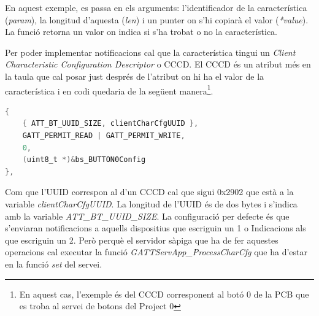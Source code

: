 En aquest exemple, es passa en els arguments: l'identificador de la característica (\textit{param}), la longitud d'aquesta (\textit{len}) i un punter on s'hi copiarà el valor (\textit{*value}).
La funció retorna un valor on indica si s'ha trobat o no la característica.

Per poder implementar notificacions cal que la característica tingui un \textit{Client Characteristic Configuration Descriptor} o CCCD.
El CCCD és un atribut més en la taula que cal posar just després de l'atribut on hi ha el valor de la característica i en codi quedaria de la següent manera\footnote{En aquest cas, l'exemple és del CCCD corresponent al botó 0 de la PCB que es troba al servei de botons del Project 0}.
\newline
\newline
\newline

\begin{lstlisting}[language=C]
{
	{ ATT_BT_UUID_SIZE, clientCharCfgUUID },
	GATT_PERMIT_READ | GATT_PERMIT_WRITE,
	0,
	(uint8_t *)&bs_BUTTON0Config
},
\end{lstlisting}

Com que l'UUID correspon al d'un CCCD cal que sigui 0x2902 que està a la variable \textit{clientCharCfgUUID}.
La longitud de l'UUID és de dos bytes i s'indica amb la variable \textit{ATT\_BT\_UUID\_SIZE}.
La configuració per defecte és que s'enviaran notificacions a aquells dispositius que escriguin un 1 o Indicacions als que escriguin un 2.
Però perquè el servidor sàpiga que ha de fer aquestes operacions cal executar la funció \textit{GATTServApp\_ProcessCharCfg} que ha d'estar en la funció \textit{set} del servei.









